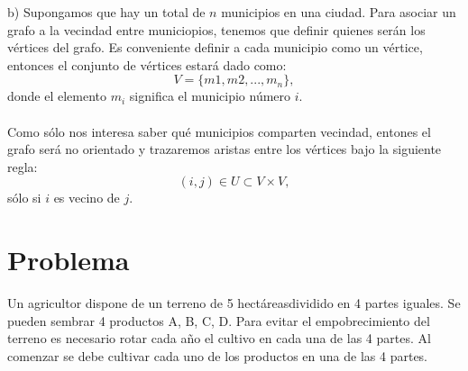 \documentclass[autocontact]{gaceta}
\begin{document}
    
    \pagebreak

    b) Supongamos que hay un total de $n$ municipios en una ciudad. Para asociar un grafo a 
    la vecindad entre municiopios, tenemos que definir quienes serán los vértices del grafo. Es 
    conveniente definir a cada municipio como un vértice, entonces el conjunto de vértices 
    estará dado como:
    \begin{equation}
        V = \{ m1, m2, ... , m_n \},
    \end{equation}
    donde el elemento $m_i$ significa el municipio número $i$.\\
    \\Como sólo nos interesa saber qué municipios comparten vecindad, entones el grafo será no 
    orientado y trazaremos aristas entre los vértices bajo la siguiente regla:
    \begin{equation}
        (i, j) \in U \subset V \times V,
    \end{equation}
    sólo si $i$ es vecino de $j$.



\section{Problema}
        Un agricultor dispone de un terreno de 5 hectáreasdividido en 4 partes iguales. Se 
        pueden sembrar 4 productos A, B, C, D. Para evitar el empobrecimiento del terreno 
        es necesario rotar cada año el cultivo en cada una de las 4 partes. Al comenzar se 
        debe cultivar cada uno de los productos en una de las 4 partes.
\end{document}
